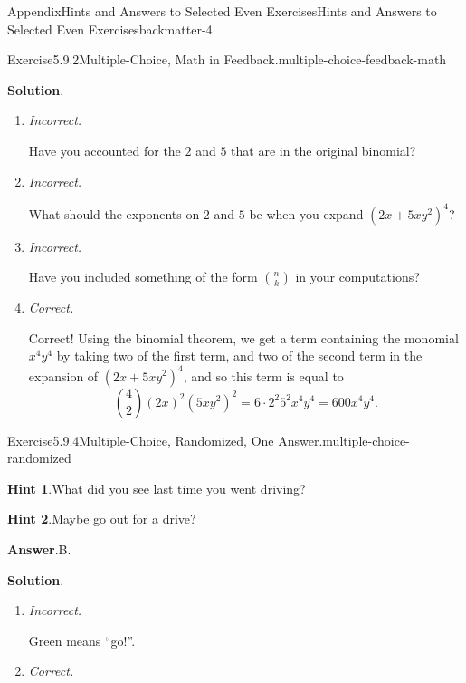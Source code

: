 \documentclass[oneside,10pt,]{book}
\newcommand{\blocktitlefont}{\relax}
\newcommand{\lititle}[1]{{\slshape#1}}
\numberwithin{equation}{section}
\begin{document}
\begin{solutions-chapter}{Appendix}{Hints and Answers to Selected Even Exercises}{}{Hints and Answers to Selected Even Exercises}{}{}{backmatter-4}
\begin{divisionsolution}{Exercise}{5.9.2}{Multiple-Choice, Math in Feedback.}{multiple-choice-feedback-math}
\par\smallskip%
\noindent\textbf{\blocktitlefont Solution}.\hypertarget{multiple-choice-feedback-math-4-back}{}\quad{}%
\begin{enumerate}[label={\Alph*.}]
\item{}\lititle{Incorrect.}\par%
Have you accounted for the \(2\) and \(5\) that are in the original binomial?%
\item{}\lititle{Incorrect.}\par%
What should the exponents on \(2\) and \(5\) be when you expand \((2x+5xy^2)^4\)?%
\item{}\lititle{Incorrect.}\par%
Have you included something of the form \(\binom{n}{k}\) in your computations?%
\item{}\lititle{Correct.}\par%
Correct! Using the binomial theorem, we get a term containing the monomial \(x^4y^4\) by taking two of the first term, and two of the second term in the expansion of \((2x+5xy^2)^4\), and so this term is equal to%
\begin{equation*}
\binom{4}{2} (2x)^2 (5xy^2)^2 = 6 \cdot 2^2 5^2 x^4 y^4 = 600 x^4 y^4\text{.}
\end{equation*}
%
\end{enumerate}
%
\end{divisionsolution}%
\begin{divisionsolution}{Exercise}{5.9.4}{Multiple-Choice, Randomized, One Answer.}{multiple-choice-randomized}%
\par\smallskip%
\noindent\textbf{\blocktitlefont Hint 1}.\hypertarget{multiple-choice-randomized-4-back}{}\quad{}What did you see last time you went driving?%
\par\smallskip%
\noindent\textbf{\blocktitlefont Hint 2}.\hypertarget{multiple-choice-randomized-5-back}{}\quad{}Maybe go out for a drive?%
\par\smallskip%
\noindent\textbf{\blocktitlefont Answer}.\hypertarget{multiple-choice-randomized-6-back}{}\quad{}B.%
\par\smallskip%
\noindent\textbf{\blocktitlefont Solution}.\hypertarget{multiple-choice-randomized-7-back}{}\quad{}%
\begin{enumerate}[label={\Alph*.}]
\item{}\lititle{Incorrect.}\par%
Green means ``go!''.%
\item{}\lititle{Correct.}\par%

\end{enumerate}
\end{divisionsolution}
\end{solutions-chapter}
\end{document}
